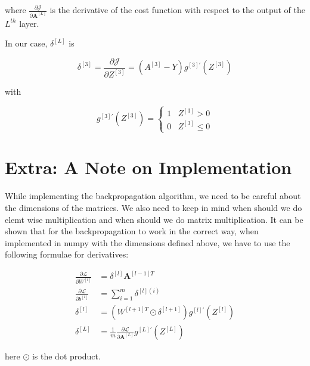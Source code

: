 \documentclass[12pt]{article}
\begin{document}
where $\frac{\partial \mathcal{J}}{\partial \mathbf{A}^{[L]}}$ is the derivative of the cost function with respect to the output of the $L^{th}$ layer.

In our case, $\delta^{[L]}$ is

$$
    \delta^{[3]} = \frac{\partial{\mathcal{J}}}{\partial Z^{[3]}} = \left(A^{[3]} - Y \right) g^{[3]'}(Z^{[3]})
$$

with

$$
    g^{[3]'}(Z^{[3]}) = \begin{cases}
        1 & Z^{[3]} > 0    \\
        0 & Z^{[3]} \leq 0
    \end{cases}
$$

\section{Extra: A Note on Implementation}
While implementing the backpropagation algorithm, we need to be careful about the dimensions of the matrices. We also need to keep in mind when should we do elemt wise multiplication and when should we do matrix multiplication. It can be shown that for the backpropagation to work in the correct way, when implemented in numpy with the dimensions defined above, we have to use the following formulae for derivatives:

$$
    \begin{aligned}
        \frac{\partial \mathcal{L}}{\partial W^{[l]}} & = \delta^{[l]} \mathbf{A}^{[l-1] T}                                                     \\
        \frac{\partial \mathcal{L}}{\partial b^{[l]}} & = \sum_{i=1}^{m} \delta^{[l](i)}                                                        \\
        \delta^{[l]}                                  & = (W^{[l+1] T} \odot \delta^{[l+1]})  g^{[l]'}(Z^{[l]})                                 \\
        \delta^{[L]}                                  & = \frac{1}{m} \frac{\partial \mathcal{L}}{\partial \mathbf{A}^{[L]}}  g^{[L]'}(Z^{[L]})
    \end{aligned}
$$

here $\odot$ is the dot product.
\end{document}
